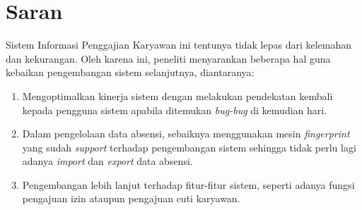 \section{Saran}
Sistem Informasi Penggajian Karyawan ini tentunya tidak lepas dari kelemahan dan kekurangan. Oleh karena ini, peneliti menyarankan beberapa hal guna kebaikan pengembangan sistem selanjutnya, diantaranya:
\begin{enumerate}
    \itemsep0em
    \item Mengoptimalkan kinerja sistem dengan melakukan pendekatan kembali kepada pengguna sistem apabila ditemukan \emph{bug-bug} di kemudian hari.
    \item Dalam pengelolaan data absensi, sebaiknya menggunakan mesin \emph{fingerprint} yang sudah \emph{support} terhadap pengembangan sistem sehingga tidak perlu lagi adanya \emph{import} dan \emph{export} data absensi.
    \item Pengembangan lebih lanjut terhadap fitur-fitur sistem, seperti adanya fungsi pengajuan izin ataupun pengajuan cuti karyawan.
\end{enumerate}
	
	
\begin{comment}

\end{comment}
